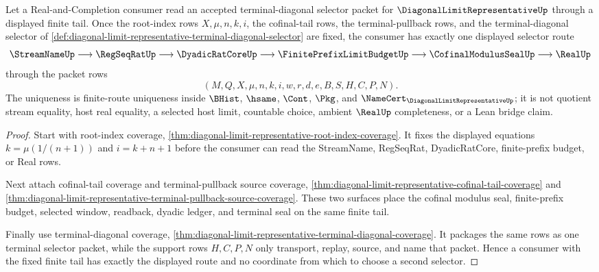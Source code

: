 \begin{theorem}
\label{thm:diagonal-limit-representative-finite-tail-selector-uniqueness}
Let a Real-and-Completion consumer read an accepted terminal-diagonal selector packet for $\DiagonalLimitRepresentativeUp$ through a displayed finite tail. Once the root-index rows $X,\mu,n,k,i$, the cofinal-tail rows, the terminal-pullback rows, and the terminal-diagonal selector of \autoref{def:diagonal-limit-representative-terminal-diagonal-selector} are fixed, the consumer has exactly one displayed selector route
$$
\StreamNameUp \longrightarrow \RegSeqRatUp \longrightarrow \DyadicRatCoreUp \longrightarrow \FinitePrefixLimitBudgetUp \longrightarrow \CofinalModulusSealUp \longrightarrow \RealUp
$$
through the packet rows
$$
(M,Q,X,\mu,n,k,i,w,r,d,e,B,S,H,C,P,N).
$$
The uniqueness is finite-route uniqueness inside $\BHist$, $\hsame$, $\Cont$, $\Pkg$, and $\NameCert_{\DiagonalLimitRepresentativeUp}$; it is not quotient stream equality, host real equality, a selected host limit, countable choice, ambient $\RealUp$ completeness, or a Lean bridge claim.
\end{theorem}
\begin{proof}
Start with root-index coverage, \autoref{thm:diagonal-limit-representative-root-index-coverage}. It fixes the displayed equations $k=\mu(1/(n+1))$ and $i=k+n+1$ before the consumer can read the StreamName, RegSeqRat, DyadicRatCore, finite-prefix budget, or Real rows.

Next attach cofinal-tail coverage and terminal-pullback source coverage, \autoref{thm:diagonal-limit-representative-cofinal-tail-coverage} and \autoref{thm:diagonal-limit-representative-terminal-pullback-source-coverage}. These two surfaces place the cofinal modulus seal, finite-prefix budget, selected window, readback, dyadic ledger, and terminal seal on the same finite tail.

Finally use terminal-diagonal coverage, \autoref{thm:diagonal-limit-representative-terminal-diagonal-coverage}. It packages the same rows as one terminal selector packet, while the support rows $H,C,P,N$ only transport, replay, source, and name that packet. Hence a consumer with the fixed finite tail has exactly the displayed route and no coordinate from which to choose a second selector.
\end{proof}

